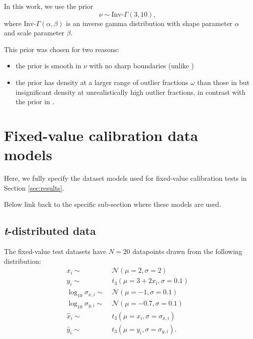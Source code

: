 \documentclass[fleqn,usenatbib]{rasti}
\begin{document}
In this work, we use the prior
\begin{equation}
    \nu \sim \text{Inv-}\Gamma(3, 10),
\end{equation}
where $\text{Inv-}\Gamma(\alpha, \beta)$ is an inverse gamma distribution with
{\color{red} shape parameter $\alpha$ and scale parameter $\beta$}.

This prior was chosen for two reasons:
\begin{itemize}
    \item the prior is smooth in $\nu$ with no sharp boundaries (unlike
          \citet{Gelman:2013})
    \item the prior has density at a larger range of outlier fractions $\omega$
          than those in \citet{Juarez:2010, Ding:2014} but insignificant density
          at unrealistically high outlier fractions, in contrast with the prior
          in \citet{Feeney:2018}.
\end{itemize}

\section{Fixed-value calibration data models}
\label{sec:data-models}

Here, we fully specify the dataset models used for fixed-value
calibration tests in Section \ref{sec:results}.

{\color{green} Below link back to the specific sub-section where these models are used. }

\subsection{\textit{t}-distributed data}
\label{sec:data-models.t}

The fixed-value test datasets have $N = 20$ datapoints drawn from the following
distribution:
\begin{align}
    x_i \sim&\; \mathcal N (\mu = 2, \sigma = 2) \\
    y_i \sim&\; t_{3} (\mu = 3 + 2 x_i, \sigma = 0.1) \\
    \log_{10} \sigma_{x, i} \sim&\; \mathcal N (\mu = -1, \sigma = 0.1) \\
    \log_{10} \sigma_{y, i} \sim&\; \mathcal N (\mu = -0.7, \sigma = 0.1) \\
    \hat{x}_i \sim&\; t_{3} (\mu = x_i, \sigma = \sigma_{x, i}) \\
    \hat{y}_i \sim&\; t_{3} (\mu = y_i, \sigma = \sigma_{y, i}).
\end{align}
\end{document}

